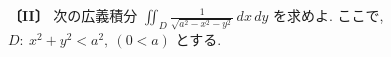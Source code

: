\noindent\textbf{〔II〕}
次の広義積分 $\displaystyle\iint_D \frac{1}{\sqrt{a^2-x^2-y^2}}\,dx\,dy$ を求めよ.
ここで, $D:\ x^2+y^2<a^2,\ (0<a)$ とする.
